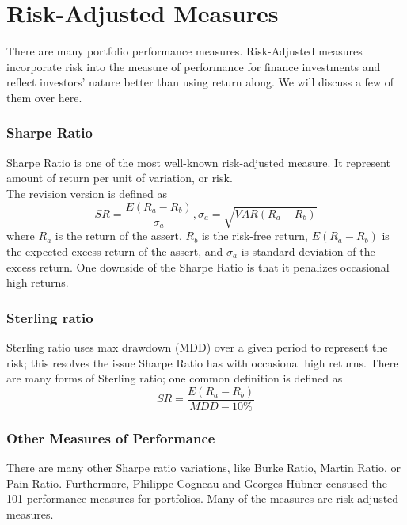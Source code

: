 \section{Risk-Adjusted Measures}
There are many portfolio performance measures.\cite{cogneau2009101,cogneau2009more,cogneau2009more2}
Risk-Adjusted measures incorporate risk into the measure of performance for finance investments and reflect investors' nature better than using return along.
We will discuss a few of them over here.
\subsubsection{Sharpe Ratio}
Sharpe Ratio\cite{Sharpe49} is one of the most well-known risk-adjusted measure. It represent amount of return per unit of variation, or risk.\\
The revision version is defined as
\[ SR = \frac{E(R_a - R_b)}{\sigma_a},
\sigma_a = \sqrt{VAR(R_a-R_b)}\]
where \(R_a\) is the return of the assert, 
\(R_b\) is the risk-free return,
\(E(R_a - R_b)\) is the expected excess return of the assert,
and \(\sigma_a\) is standard deviation of the excess return.
One downside of the Sharpe Ratio is that it penalizes occasional high returns\cite{9206647}.
\subsubsection{Sterling ratio}
Sterling ratio\cite{magdon2004maximum} uses max drawdown (MDD) over a given period to represent the risk; this resolves the issue Sharpe Ratio has with occasional high returns. 
There are many forms of Sterling ratio; one common definition\cite{magdon2004maximum} is defined as 
\[ SR = \frac{E(R_a - R_b)}{MDD - 10\%}\]


\subsubsection{Other Measures of Performance}
There are many other Sharpe ratio variations, like Burke Ratio, Martin Ratio, or Pain Ratio\cite{bacon2009sharp}. Furthermore, Philippe Cogneau and Georges Hübner censused the 101 performance measures for portfolios. Many of the measures are risk-adjusted measures\cite{cogneau2009101,cogneau2009more,cogneau2009more2}.